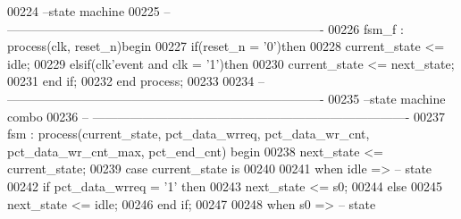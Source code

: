\begin{DoxyCode}
00224 \textcolor{keyword}{--state machine}
00225 \textcolor{keyword}{-- ----------------------------------------------------------------------------}
00226 fsm\_f : \textcolor{keywordflow}{process}(clk, reset_n)\textcolor{keywordflow}{begin}
00227     \textcolor{keywordflow}{if}\textcolor{vhdlchar}{(}\textcolor{vhdlchar}{reset_n} \textcolor{vhdlchar}{=} \textcolor{vhdlchar}{'}\textcolor{vhdllogic}{}\textcolor{vhdllogic}{0}\textcolor{vhdlchar}{'}\textcolor{vhdlchar}{)}\textcolor{keywordflow}{then}
00228         \textcolor{vhdlchar}{current_state} \textcolor{vhdlchar}{<=} \textcolor{vhdlchar}{idle};
00229     \textcolor{keywordflow}{elsif}\textcolor{vhdlchar}{(}\textcolor{vhdlchar}{clk}\textcolor{vhdlchar}{'}\textcolor{vhdlkeyword}{event} \textcolor{keywordflow}{and} \textcolor{vhdlchar}{clk} \textcolor{vhdlchar}{=} \textcolor{vhdlchar}{'}\textcolor{vhdllogic}{}\textcolor{vhdllogic}{1}\textcolor{vhdlchar}{'}\textcolor{vhdlchar}{)}\textcolor{keywordflow}{then} 
00230         \textcolor{vhdlchar}{current_state} \textcolor{vhdlchar}{<=} \textcolor{vhdlchar}{next_state};
00231     \textcolor{keywordflow}{end} \textcolor{keywordflow}{if}; 
00232 \textcolor{keywordflow}{end} \textcolor{keywordflow}{process};
00233 
00234 \textcolor{keyword}{-- ----------------------------------------------------------------------------}
00235 \textcolor{keyword}{--state machine combo}
00236 \textcolor{keyword}{-- ----------------------------------------------------------------------------}
00237 fsm : \textcolor{keywordflow}{process}(current_state, pct_data_wrreq, pct_data_wr_cnt, 
      pct_data_wr_cnt_max, pct_end_cnt) \textcolor{keywordflow}{begin}
00238     \textcolor{vhdlchar}{next_state} \textcolor{vhdlchar}{<=} \textcolor{vhdlchar}{current_state};
00239     \textcolor{keywordflow}{case} \textcolor{vhdlchar}{current_state} \textcolor{keywordflow}{is}
00240       
00241         \textcolor{keywordflow}{when} \textcolor{vhdlchar}{idle} \textcolor{vhdlchar}{=}\textcolor{vhdlchar}{>}\textcolor{keyword}{ -- state}
00242          \textcolor{keywordflow}{if} \textcolor{vhdlchar}{pct_data_wrreq} \textcolor{vhdlchar}{=} \textcolor{vhdlchar}{'}\textcolor{vhdllogic}{}\textcolor{vhdllogic}{1}\textcolor{vhdlchar}{'} \textcolor{keywordflow}{then} 
00243             \textcolor{vhdlchar}{next_state} \textcolor{vhdlchar}{<=} \textcolor{vhdlchar}{s0};
00244          \textcolor{keywordflow}{else} 
00245             \textcolor{vhdlchar}{next_state} \textcolor{vhdlchar}{<=} \textcolor{vhdlchar}{idle};
00246          \textcolor{keywordflow}{end} \textcolor{keywordflow}{if};
00247          
00248       \textcolor{keywordflow}{when} \textcolor{vhdlchar}{s0} \textcolor{vhdlchar}{=}\textcolor{vhdlchar}{>}\textcolor{keyword}{ -- state}

\end{DoxyCode}
